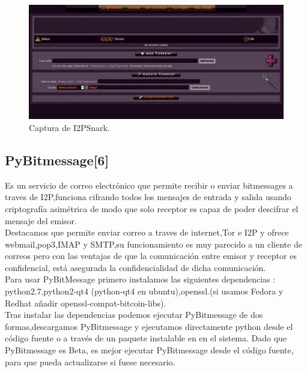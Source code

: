 \documentclass[12]{article}
\begin{document}
\begin{figure}[H]
    \centering
    \includegraphics[width=1\textwidth]{media/i2p_3.jpg}
    \caption{Captura de I2PSnark.}
    \label{fig5}
\end{figure}


\subsection{PyBitmessage[6]}
Es un servicio de correo electrónico que permite recibir o enviar bitmessages a traves de I2P,funciona cifrando todos los mensajes de entrada y salida
usando criptografía asimétrica de modo que solo receptor es capaz de poder descifrar el mensaje del emisor.
\\

Destacamos que permite enviar correo a traves de internet,Tor e I2P y ofrece webmail,pop3,IMAP y SMTP,su funcionamiento es muy parecido a un cliente de correos
pero con las ventajas de que la comunicación entre  emisor y receptor es confidencial, está asegurada la confidencialidad de dicha comunicación.  
\\

Para usar PyBitMessage  primero instalamos las siguientes dependencias : python2.7,python2-qt4 (python-qt4 en ubuntu),openssl.(si usamos  Fedora y Redhat añadir openssl-compat-bitcoin-libs).
\\

Tras instalar las dependencias podemos ejecutar PyBitmessage de dos formas,descargamos PyBitmessage y ejecutamos directamente python desde el código fuente o a través de un paquete 
instalable en en el sistema. Dado que PyBitmessage es Beta, es mejor  ejecutar PyBitmessage desde el código fuente, para que pueda actualizarse si fuese necesario.
\\
\end{document}
